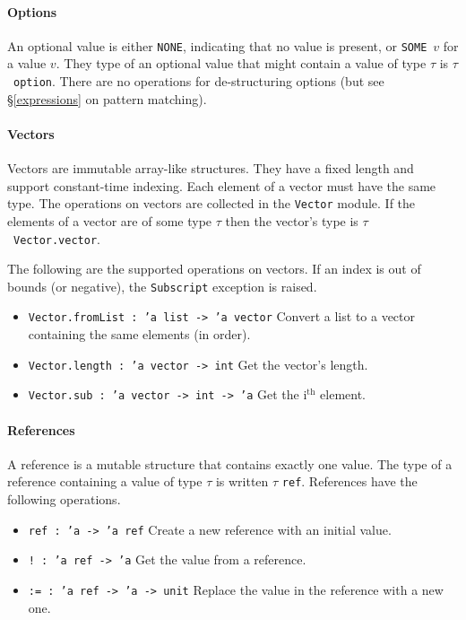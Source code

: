 \documentclass[12pt,a4paper]{book}
\begin{document}
\paragraph{Options} An optional value is either \texttt{NONE}, indicating that no value is present, or \texttt{SOME}\ $v$ for a value $v$. They type of an optional value that might contain a value of type $\tau$ is $\tau$\ \texttt{option}. There are no operations for de-structuring options (but see \S\ref{expressions} on pattern matching).



\paragraph{Vectors}

Vectors are immutable array-like structures. They have a fixed length and support constant-time indexing. Each element of a vector must have the same type. The operations on vectors are collected in the \texttt{Vector} module. If the elements of a vector are of some type $\tau$ then the vector's type is $\tau$\ \texttt{Vector.vector}.

The following are the supported operations on vectors. If an index is out of bounds (or negative), the \texttt{Subscript} exception is raised.
\begin{itemize}
\item \texttt{Vector.fromList : 'a list -> 'a vector} Convert a list to a vector containing the same elements (in order).
\item \texttt{Vector.length : 'a vector -> int} Get the vector's length.
\item \texttt{Vector.sub : 'a vector -> int -> 'a} Get the i$^\textrm{th}$ element.
\end{itemize}

\paragraph{References}

A reference is a mutable structure that contains exactly one value. The type of a reference containing a value of type $\tau$ is written $\tau$ \texttt{ref}.
References have the following operations.
\begin{itemize}
\item
\texttt{ref : 'a -> 'a ref} Create a new reference with an initial value.
\item
\texttt{! : 'a ref -> 'a} Get the value from a reference.
\item
\texttt{:= : 'a ref -> 'a -> unit} Replace the value in the reference with a new one.
\end{itemize}
\end{document}
